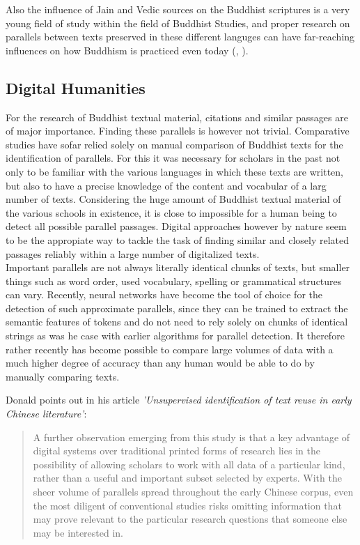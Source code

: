 Also the influence of Jain and Vedic sources on the Buddhist scriptures is a very young field of study within the field of Buddhist Studies, and proper research on parallels between texts preserved in these different languges can have far-reaching influences on how Buddhism is practiced even today (\cite{maes}, \cite{vimala}). 

\subsection{Digital Humanities}
For the research of Buddhist textual material, citations and similar passages are of major importance. Finding these parallels is however not trivial. Comparative studies have sofar relied solely on manual comparison of Buddhist texts for the identification of parallels. For this it was necessary for scholars in the past not only to be familiar with the various languages in which these texts are written, but also to have a precise knowledge of the content and vocabular of a larg number of texts. Considering the huge amount of Buddhist textual material of the various schools in existence, it is close to impossible for a human being to detect all possible parallel passages. Digital approaches however by nature seem to be the appropiate way to tackle the task of finding similar and closely related passages reliably within a large number of digitalized texts.\\

Important parallels are not always literally identical chunks of texts, but smaller things such as word order, used vocabulary, spelling or grammatical structures can vary. Recently, neural networks have become the tool of choice for the detection of such approximate parallels, since they can be trained to extract the semantic features of tokens and do not need to rely solely on chunks of identical strings as was he case with earlier algorithms for parallel detection. 
It therefore rather recently has become possible to compare large volumes of data with a much higher degree of accuracy than any human would be able to do by manually comparing texts.

Donald \cite{sturgeon2017} points out in his article {\em 'Unsupervised identification of text reuse in early Chinese literature'}: 

\begin{quote}
A further observation emerging from this study is that a key advantage of digital systems over traditional printed forms of research lies in the possibility of allowing scholars to work with all data of a particular kind, rather than a useful and important subset selected by experts. With the sheer volume of parallels spread throughout the early Chinese corpus, even the most diligent of conventional studies risks omitting information that may prove relevant to the particular research questions that someone else may be interested in.
\end{quote}

